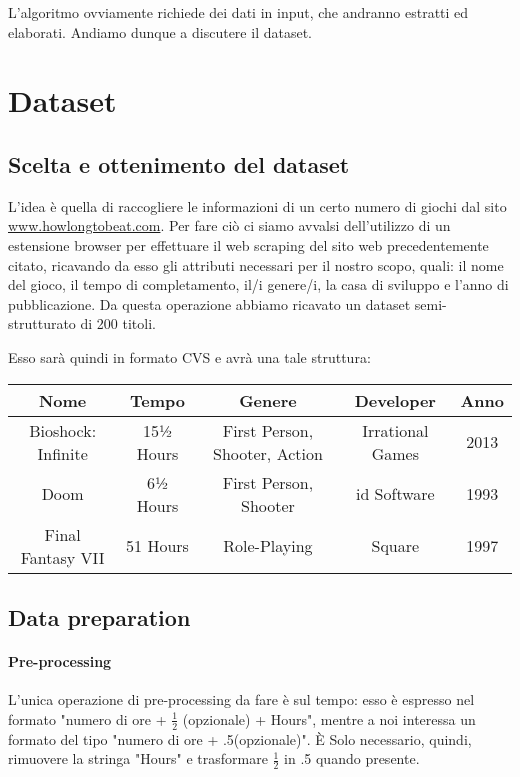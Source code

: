         L'algoritmo ovviamente richiede dei dati in input, che andranno estratti ed elaborati. Andiamo dunque a discutere il dataset.
        
\section{Dataset}
    \subsection{Scelta e ottenimento del dataset}
        L'idea è quella di raccogliere le informazioni di un certo numero di giochi dal sito \url{www.howlongtobeat.com}. Per fare ciò ci siamo avvalsi dell'utilizzo di un estensione browser per effettuare il web scraping del sito web precedentemente citato, ricavando da esso gli attributi necessari per il nostro scopo, quali: il nome del gioco, il tempo di completamento, il/i genere/i, la casa di sviluppo e l'anno di pubblicazione. Da questa operazione abbiamo ricavato un dataset semi-strutturato di 200 titoli.
        
        Esso sarà quindi in formato CVS e avrà una tale struttura:
        \begin{table}[h]
            \begin{tabular}{|c|c|c|c|c|}
            \hline
            \textbf{Nome} & \textbf{Tempo} & \textbf{Genere}               & \textbf{Developer} & \textbf{Anno} \\ \hline
            Bioshock: Infinite & 15½ Hours & First Person, Shooter, Action & Irrational Games & 2013\\ \hline
            Doom               & 6½ Hours       & First Person, Shooter         & id Software & 1993        \\ \hline
            Final Fantasy VII  & 51 Hours       & Role-Playing                  & Square & 1997             \\ \hline
            \end{tabular}
        \end{table}
        
    \subsection{Data preparation}
    
        \paragraph{Pre-processing}
            L'unica operazione di pre-processing da fare è sul tempo: esso è espresso nel formato "numero di ore + $\frac{1}{2}$ (opzionale) + Hours", mentre a noi interessa un formato del tipo "numero di ore + .5(opzionale)". È Solo necessario, quindi, rimuovere la stringa "Hours" e trasformare $\frac{1}{2}$ in .5 quando presente.
        
